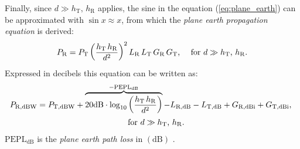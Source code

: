 Finally, since $d \gg h_\mathrm{T} \text{, } h_\mathrm{R}$ applies, the sine in the equation (\ref{eq:plane_earth}) can be approximated with $\sin x \approx x$, from which the \emph{plane earth propagation equation} is derived:
\begin{equation} \label{eq:plane_earth_approx}
	\centering
	P_\mathrm{R} = P_\mathrm{T} \left(\dfrac{h_\mathrm{T} \, h_\mathrm{R}}{d^2}\right)^2 L_\mathrm{R} \, L_\mathrm{T} \, G_\mathrm{R} \, G_\mathrm{T}\text{, } \quad \text{for } d \gg h_\mathrm{T}\text{, } h_\mathrm{R}\text{.}
\end{equation}
Expressed in decibels this equation can be written as:
\begin{equation} \label{eq:plane_earth_approx_db}
	\centering
	\begin{gathered}
	P_\mathrm{R,dBW} = P_\mathrm{T,dBW} + \overbrace{20\mathrm{dB} \cdot \log_{10} \left(\dfrac{h_\mathrm{T} \, h_\mathrm{R}}{d^2}\right)}^{\mathrm{-PEPL_{dB}}} - L_\mathrm{R,dB} - L_\mathrm{T,dB} + G_\mathrm{R,dBi} + G_\mathrm{T,dBi}\text{, } \\ \quad \text{for } d \gg h_\mathrm{T}\text{, } h_\mathrm{R}\text{.}
	\end{gathered}
\end{equation}
$\mathrm{PEPL_{dB}}$ is the \emph{plane earth path loss} in $\left(\mathrm{dB}\right)$ \cite{Parsons:2000, Glover:2010, Goiser:2019}.